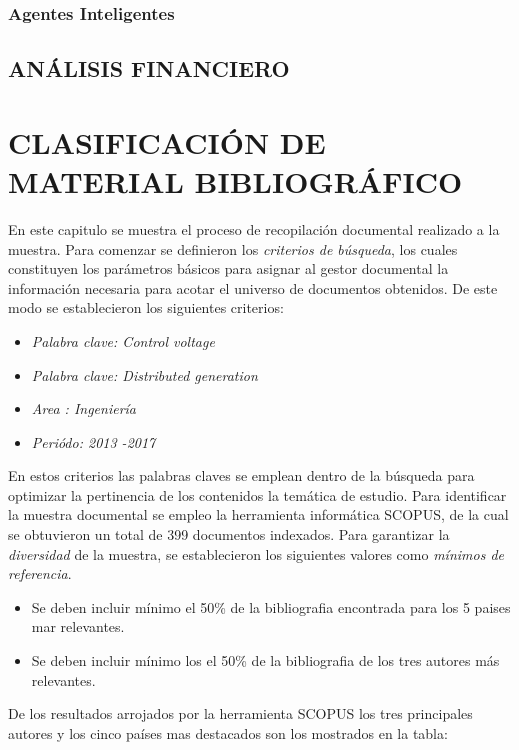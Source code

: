 \documentclass[12pt, letterpaper]{report}
\begin{document}
\subsection{Agentes Inteligentes}

\section{ANÁLISIS FINANCIERO}

\chapter{CLASIFICACIÓN DE MATERIAL BIBLIOGRÁFICO}
En este capitulo se muestra el proceso de recopilación documental realizado a  la muestra. Para comenzar se definieron los \textit{criterios de búsqueda}, los cuales constituyen los parámetros básicos para asignar al gestor documental la información necesaria para acotar el universo de documentos obtenidos. De este modo se establecieron los siguientes criterios:\\

\begin{itemize}
    \item \textit{Palabra clave: \textit{Control voltage}}
    \item \textit{Palabra clave: \textit{Distributed generation}}
    \item \textit{Area : Ingeniería}
    \item \textit{Periódo: 2013 -2017}
\end{itemize}

En estos criterios las  palabras claves se emplean dentro de la búsqueda para optimizar la pertinencia de los contenidos la temática  de estudio. Para identificar la muestra documental se empleo la herramienta informática SCOPUS, de la cual  se obtuvieron un total de 399 documentos indexados. Para garantizar  la \textit{diversidad} de la muestra, se establecieron los siguientes valores como \textit{mínimos de referencia}.

\begin{itemize}
	\item Se deben incluir mínimo el 50\% de la bibliografia encontrada para los 5  paises mar relevantes.
	\item Se deben incluir mínimo los el 50\% de la bibliografia de los tres autores más relevantes.
\end{itemize}

De los resultados arrojados por la herramienta SCOPUS los tres principales autores y los cinco países mas destacados son los  mostrados en la tabla:\\
\end{document}

